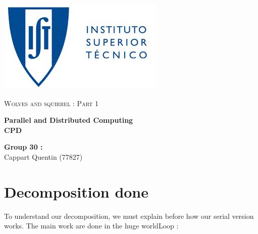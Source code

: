 \documentclass[a4paper,10pt]{article}
\begin{document}
\begin{flushleft}
\includegraphics[scale=0.3]{logo_ist.jpeg}
\end{flushleft}


\vspace{1cm}

\begin{center}{
\scshape{\LARGE Wolves and squirrel : Part 1 }}

\vspace{0.5cm}
\hbox{}
{\setlength{\parskip}{0.2cm}

 \Huge
 \bfseries
 \LARGE  Parallel and Distributed Computing
 \\
CPD \\

\vspace{0.2cm}

}
\vspace{0.5cm}

\hbox{}
\vspace{2.5cm}


\end{center}

\vspace{3cm}


\vfill
\begin{flushright}
\textbf{Group 30 :}\\
Cappart Quentin (77827)\\

\end{flushright}
\newpage

\setcounter{page}{1}

\renewcommand\thepage{\arabic{page}}


\newpage

\section*{Decomposition done}

To understand our decomposition, we must explain before how our serial version works.
The main work are done in the huge worldLoop :
\end{document}
